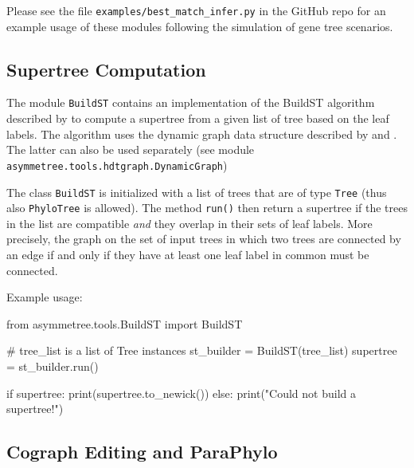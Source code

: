\documentclass[hidelinks,11pt]{article}
\begin{document}
Please see the file \texttt{examples/best\_match\_infer.py} in the GitHub repo for an example usage of these modules following the simulation of gene tree scenarios.



\subsection{Supertree Computation}

The module \texttt{BuildST} contains an implementation of the BuildST algorithm described by \citet{deng2016} to compute a supertree from a given list of tree based on the leaf labels.
The algorithm uses the dynamic graph data structure described by \citet{henzinger1995} and \citet{holm2001}.
The latter can also be used separately (see module \texttt{asymmetree.tools.hdtgraph.DynamicGraph})

The class \texttt{BuildST} is initialized with a list of trees that are of type \texttt{Tree} (thus also \texttt{PhyloTree} is allowed).
The method \texttt{run()} then return a supertree if the trees in the list are compatible \emph{and} they overlap in their sets of leaf labels.
More precisely, the graph on the set of input trees in which two trees are connected by an edge if and only if they have at least one leaf label in common must be connected.

Example usage:

\vspace{2mm}
\begin{python}
from asymmetree.tools.BuildST import BuildST

# tree_list is a list of Tree instances
st_builder = BuildST(tree_list)
supertree = st_builder.run()

if supertree:
	print(supertree.to_newick())
else:
	print("Could not build a supertree!")
\end{python}
\vspace{2mm}


\subsection{Cograph Editing and ParaPhylo}
\end{document}
